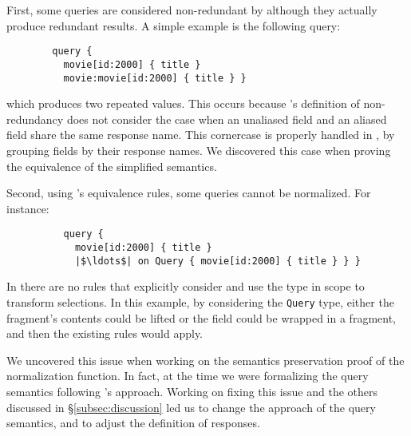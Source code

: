 First, some queries are considered non-redundant by \HP although they actually produce redundant results.
A simple example is the following query:

\begin{verbatim}
        query {
          movie[id:2000] { title }
          movie:movie[id:2000] { title } }
\end{verbatim}
which produces two repeated values. This occurs because \HP's definition of non-redundancy does not consider the case when an unaliased field and an aliased field share the same response name. This cornercase is properly handled in \gcoql, by grouping fields by their response names. We discovered this case when proving the equivalence of the simplified semantics.

Second, using \HP's equivalence rules, some queries cannot be normalized.
For instance:
\begin{verbatim}
          query {
            movie[id:2000] { title }
            |$\ldots$| on Query { movie[id:2000] { title } } }
\end{verbatim}
In \HP there are no rules that explicitly consider and use the type in scope to transform selections. In this example, by considering the \texttt{Query} type, either the fragment's contents could be lifted or the field could be wrapped in a fragment, and then the existing rules would apply. 


%
We uncovered this issue when working on the semantics preservation proof of the normalization function. In fact, at the time we were formalizing the query semantics following \HP's approach. Working on fixing this issue and the others discussed in \S\ref{subsec:discussion} led us to change the approach of the query semantics, and to adjust the definition of responses.

